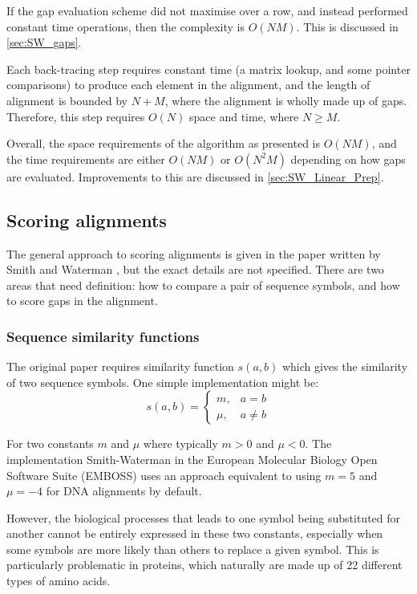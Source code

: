 If the gap evaluation scheme did not maximise over a row, and instead performed constant time operations, then the complexity is $O(NM)$.
This is discussed in \cref{sec:SW_gaps}.

Each back-tracing step requires constant time (a matrix lookup, and some pointer comparisons) to produce each element in the alignment, and the length of alignment is bounded by $N+M$, where the alignment is wholly made up of gaps.
Therefore, this step requires $O(N)$ space and time, where $N\geq M$.

Overall, the space requirements of the algorithm as presented is $O(NM)$, and the time requirements are either $O(NM)$ or $O(N^2 M)$ depending on how gaps are evaluated.
Improvements to this are discussed in \cref{sec:SW_Linear_Prep}.

\subsection{Scoring alignments}
\label{sec:SW_Scoring}

The general approach to scoring alignments is given in the paper written by Smith and Waterman \cite{SW_Original}, but the exact details are not specified.
There are two areas that need definition: how to compare a pair of sequence symbols, and how to score gaps in the alignment.

\subsubsection{Sequence similarity functions}
\label{sec:SW_similarity_functions}
The original paper requires similarity function $s(a,b)$ which gives the similarity of two sequence symbols. One simple implementation might be:
$$s(a, b) = \begin{cases}
m,   & a =    b \\
\mu, & a \neq b
\end{cases}$$

For two constants $m$ and $\mu$ where typically $m>0$ and $\mu<0$.
The implementation Smith-Waterman in the European Molecular Biology Open Software Suite (EMBOSS) \cite{EMBOSS} uses an approach equivalent to using $m=5$ and $\mu=-4$ for DNA alignments by default.

However, the biological processes that leads to one symbol being substituted for another cannot be entirely expressed in these two constants, especially when some symbols are more likely than others to replace a given symbol.
This is particularly problematic in proteins, which naturally are made up of 22 different types of amino acids.

